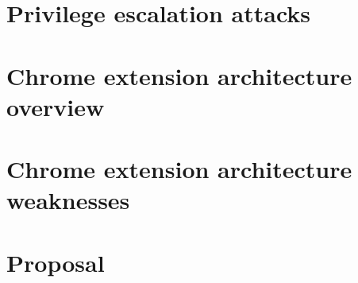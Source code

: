 \section{Privilege escalation attacks}
\label{sec:Escalation}

\section{Chrome extension architecture overview}
\label{sec:ExtOverview}

\section{Chrome extension architecture weaknesses}
\label{sec:ExtWeakness}

\section{Proposal}
\label{sec:Proposal}